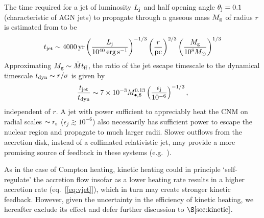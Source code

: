 \documentclass[usenatbib,fleqn]{mn2e}
\begin{document}
The time required for a jet of luminosity $L_{\rm
  j}$ and half opening angle $\theta_{\rm j} = 0.1$ (characteristic of
AGN jets) to propagate through a gaseous mass $M_{\rm g}$ of radius $r$ is estimated from \citet{Bromberg+11} to be 
\begin{eqnarray}
  t_{\rm jet} \sim 4000\,{\rm yr}\left(\frac{{L}_{\rm j}}{10^{40}\,\rm erg\,s^{-1}}\right)^{-1/3}\left(\frac{r}{\rm pc}\right)^{2/3}\left(\frac{M_{\rm g}}{10^{8}M_{\odot}}\right)^{1/3} 
\end{eqnarray}
Approximating $M_{\rm g} \sim \dot{M}t_{\rm ff}$, the ratio of the jet
escape timescale to the dynamical timescale $t_{\rm dyn} \sim
r/\sigma$ is given by
\begin{equation}
  \frac{t_{\rm jet}}{t_{\rm dyn}} \sim 7\times 10^{-3}M_{\bullet,8}^{0.13}\left(\frac{\epsilon_{\rm j}}{10^{-6}}\right)^{-1/3},
\end{equation}
independent of $r$.  A jet with power sufficient to appreciably heat
the CNM on radial scales $\sim r_{\rm s}$ ($\epsilon_{j} \gtrsim
10^{-6}$) also necessarily has sufficient power to escape the nuclear
region and propagate to much larger radii.  Slower outflows from the
accretion disk, instead of a collimated relativistic jet, may provide
a more promising source of feedback in these systems
(e.g.~\citealt{Li+13}).

As in the case of Compton heating, kinetic heating could in principle
`self-regulate' the accretion flow insofar as a lower heating rate
results in a higher accretion rate (eq.~[\ref{eq:vjet}]), which in
turn may create stronger kinetic feedback.  However, given the uncertainty
in the efficiency of kinetic heating, we hereafter exclude its effect and defer further discussion
to $\S\ref{sec:kinetic}$.
\end{document}
